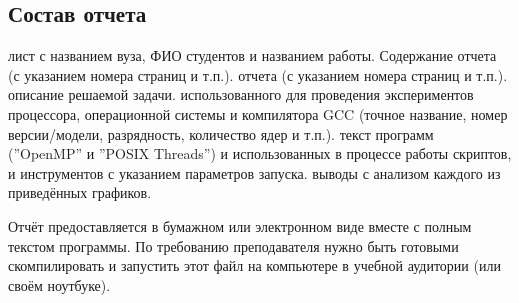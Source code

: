 \subsection{Состав отчета}

\begin{enumerate}
     лист с названием вуза, ФИО студентов и названием работы. Содержание отчета (с указанием номера страниц и т.п.).
     отчета (с указанием номера страниц и т.п.).
     описание решаемой задачи.
     использованного для проведения экспериментов процессора, операционной системы и компилятора GCC (точное название, номер версии/модели, разрядность, количество ядер и т.п.).
     текст программ (''OpenMP'' и ''POSIX Threads'') и использованных в процессе работы скриптов, и инструментов с указанием параметров запуска.
     выводы с анализом каждого из приведённых графиков.
\end{enumerate}

Отчёт предоставляется в бумажном или электронном виде вместе с полным текстом программы. По требованию преподавателя нужно быть готовыми скомпилировать и запустить этот файл на компьютере в учебной аудитории (или своём ноутбуке).
